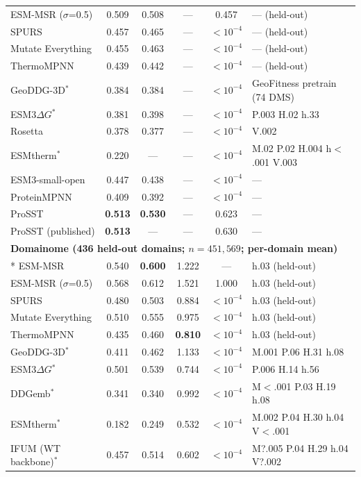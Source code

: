 {\begin{longtable}{lccccl}
ESM-MSR ($\sigma$=0.5) & 0.509 & 0.508 & --- & 0.457 & --- (held-out) \\
SPURS & 0.457 & 0.465 & --- & $<10^{-4}$ & --- (held-out) \\
Mutate Everything & 0.455 & 0.463 & --- & $<10^{-4}$ & --- (held-out) \\
ThermoMPNN & 0.439 & 0.442 & --- & $<10^{-4}$ & --- (held-out) \\
GeoDDG-3D$^*$ & 0.384 & 0.384 & --- & $<10^{-4}$ & GeoFitness pretrain (74 DMS) \\
ESM3$\Delta G$$^*$ & 0.381 & 0.398 & --- & $<10^{-4}$ & P.003 H.02 h.33 \\
Rosetta & 0.378 & 0.377 & --- & $<10^{-4}$ & V.002 \\
ESMtherm$^*$ & 0.220 & --- & --- & $<10^{-4}$ & M.02 P.02 H.004 h$<$.001 V.003 \\
ESM3-small-open & 0.447 & 0.438 & --- & $<10^{-4}$ & --- \\
ProteinMPNN & 0.409 & 0.392 & --- & $<10^{-4}$ & --- \\
ProSST & \textbf{0.513} & \textbf{0.530} & --- & 0.623 & --- \\
ProSST (published) & \textbf{0.513} & --- & --- & 0.630 & --- \\
\midrule
\multicolumn{6}{l}{\textbf{Domainome (436 held-out domains; $n=451{,}569$; per-domain mean)}} \\*
\midrule
ESM-MSR & 0.540 & \textbf{0.600} & 1.222 & --- & h.03 (held-out) \\
ESM-MSR ($\sigma$=0.5) & 0.568 & 0.612 & 1.521 & 1.000 & h.03 (held-out) \\
SPURS & 0.480 & 0.503 & 0.884 & $<10^{-4}$ & h.03 (held-out) \\
Mutate Everything & 0.510 & 0.555 & 0.975 & $<10^{-4}$ & h.03 (held-out) \\
ThermoMPNN & 0.435 & 0.460 & \textbf{0.810} & $<10^{-4}$ & h.03 (held-out) \\
GeoDDG-3D$^*$ & 0.411 & 0.462 & 1.133 & $<10^{-4}$ & M.001 P.06 H.31 h.08 \\
ESM3$\Delta G$$^*$ & 0.501 & 0.539 & 0.744 & $<10^{-4}$ & P.006 H.14 h.56 \\
DDGemb$^*$ & 0.341 & 0.340 & 0.992 & $<10^{-4}$ & M$<$.001 P.03 H.19 h.08 \\
ESMtherm$^*$ & 0.182 & 0.249 & 0.532 & $<10^{-4}$ & M.002 P.04 H.30 h.04 V$<$.001 \\
IFUM (WT backbone)$^*$ & 0.457 & 0.514 & 0.602 & $<10^{-4}$ & M?.005 P.04 H.29 h.04 V?.002 \\

\end{longtable}}
